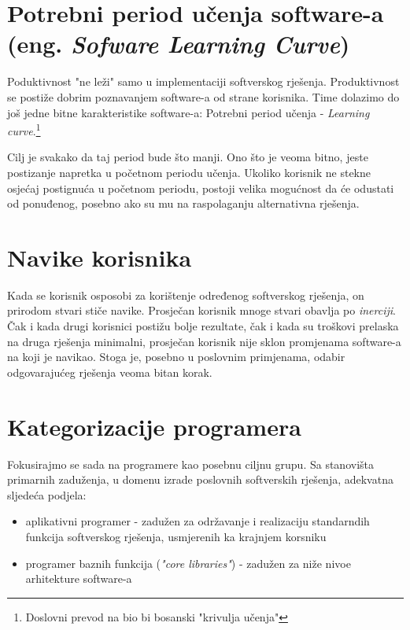 \documentclass[times, utf8, seminar]{fit}
\begin{document}
\section{Potrebni period učenja software-a (eng. \emph{Sofware Learning Curve})}

Poduktivnost "ne leži" samo u implementaciji softverskog rješenja. Produktivnost se postiže dobrim poznavanjem software-a od strane korisnika. Time dolazimo do još jedne bitne karakteristike software-a: Potrebni period učenja - \emph{Learning curve}.\footnote{Doslovni prevod na bio bi bosanski "krivulja učenja"}

Cilj je svakako da taj period bude što manji. Ono što je veoma bitno, jeste postizanje napretka u početnom periodu učenja. Ukoliko korisnik ne stekne osjećaj postignuća u početnom periodu, postoji velika mogućnost da će odustati od ponuđenog, posebno ako su mu na raspolaganju alternativna rješenja.

\section{Navike korisnika}

Kada se korisnik osposobi za korištenje određenog softverskog rješenja, on prirodom stvari stiče navike. Prosječan korisnik mnoge stvari obavlja po \emph{inerciji}. Čak i kada drugi korisnici postižu bolje rezultate, čak i kada su troškovi prelaska na druga rješenja minimalni, prosječan korisnik nije sklon promjenama software-a na koji je navikao. Stoga je, posebno u poslovnim primjenama, odabir odgovarajućeg rješenja veoma bitan korak.

\section{Kategorizacije programera}

Fokusirajmo se sada na programere kao posebnu ciljnu grupu. Sa stanovišta primarnih zaduženja, u domenu izrade poslovnih softverskih rješenja, adekvatna sljedeća podjela:

\begin{itemize}
  \item aplikativni programer - zadužen za održavanje i realizaciju standarndih funkcija softverskog rješenja, usmjerenih ka krajnjem korsniku 
  \item programer baznih funkcija (\emph{"core libraries"}) - zadužen za niže nivoe arhitekture software-a
\end{itemize}
\end{document}
